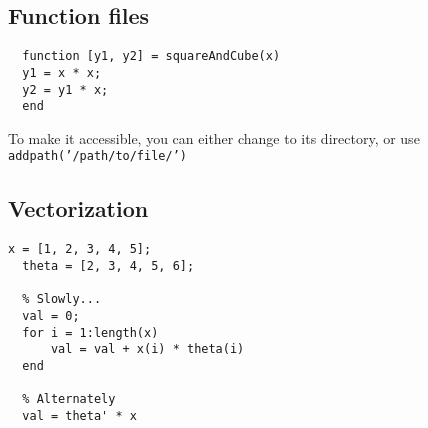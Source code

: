 \subsection{Function files}

\begin{lstlisting}[style=Matlab-editor]
  % In squareAndCube.m
  function [y1, y2] = squareAndCube(x)
  y1 = x * x;
  y2 = y1 * x;
  end
\end{lstlisting}

To make it accessible, you can either change to its directory,
or use \texttt{addpath('/path/to/file/')}

\subsection{Vectorization}

\begin{lstlisting}[style=Matlab-editor]
  x = [1, 2, 3, 4, 5];
  theta = [2, 3, 4, 5, 6];

  % Slowly...
  val = 0;
  for i = 1:length(x)
      val = val + x(i) * theta(i)
  end

  % Alternately
  val = theta' * x
\end{lstlisting}